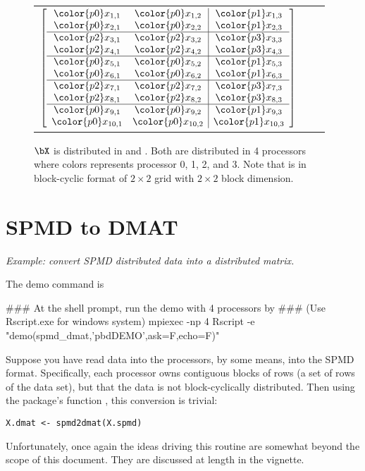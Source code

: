 \begin{figure}
\begin{center}
\begin{tabular}{ccc}
$
\left[
\begin{array}{cc|c}
\color{p0}x_{1,1} & \color{p0}x_{1,2} & \color{p1}x_{1,3} \\
\color{p0}x_{2,1} & \color{p0}x_{2,2} & \color{p1}x_{2,3} \\ \hline
\color{p2}x_{3,1} & \color{p2}x_{3,2} & \color{p3}x_{3,3} \\
\color{p2}x_{4,1} & \color{p2}x_{4,2} & \color{p3}x_{4,3} \\ \hline
\color{p0}x_{5,1} & \color{p0}x_{5,2} & \color{p1}x_{5,3} \\
\color{p0}x_{6,1} & \color{p0}x_{6,2} & \color{p1}x_{6,3} \\ \hline
\color{p2}x_{7,1} & \color{p2}x_{7,2} & \color{p3}x_{7,3} \\
\color{p2}x_{8,1} & \color{p2}x_{8,2} & \color{p3}x_{8,3} \\ \hline
\color{p0}x_{9,1} & \color{p0}x_{9,2} & \color{p1}x_{9,3} \\
\color{p0}x_{10,1} & \color{p0}x_{10,2} & \color{p1}x_{10,3} \\
\end{array}
\right]
$
\end{tabular}
\end{center}
\caption{
$\bX$ is distributed in
 and .
Both are distributed in 4 processors
where colors represents processor {\color{p0}0},
{\color{p1}1}, {\color{p2}2}, and {\color{p3}3}.
Note that  is in block-cyclic format of
$2\times 2$ grid with $2\times 2$ block dimension.
}
\end{figure}











\section{SPMD to DMAT}
\label{sec:spmd2dmat}

\emph{Example:  convert SPMD distributed data into a distributed matrix.}

The demo command is
\begin{Command}
### At the shell prompt, run the demo with 4 processors by
### (Use Rscript.exe for windows system)
mpiexec -np 4 Rscript -e "demo(spmd_dmat,'pbdDEMO',ask=F,echo=F)"
\end{Command}

Suppose you have read data into the processors, by some means, into the SPMD format.  Specifically, each processor owns contiguous blocks of rows (a set of rows of the data set), but that the data is not block-cyclically distributed.  Then using the  package's function , this conversion is trivial:

\begin{lstlisting}[language=rr]
X.dmat <- spmd2dmat(X.spmd)
\end{lstlisting}

Unfortunately, once again the ideas driving this routine are somewhat beyond the scope of this document.  They are discussed at length in the  vignette.
